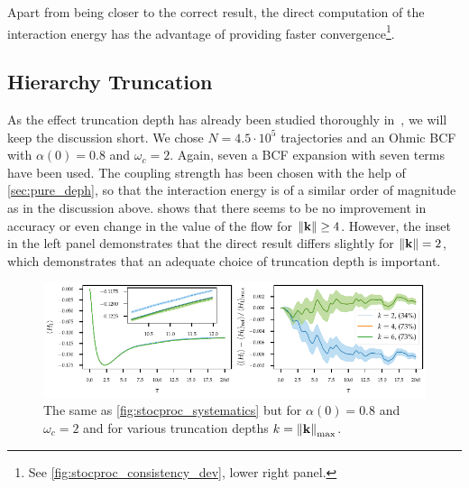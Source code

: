 Apart from being closer to the correct result, the direct computation
of the interaction energy has the advantage of providing faster
convergence\footnote{See \cref{fig:stocproc_consistency_dev}, lower right
  panel.}.

\subsection{Hierarchy Truncation}
\label{sec:trunc}
As the effect truncation depth has already been studied thoroughly
in~\cite{RichardDiss}, we will keep the discussion short.  We chose
\(N=4.5 \cdot 10^5\) trajectories and an Ohmic BCF with \(α(0)=0.8\)
and \(ω_c=2\). Again, seven a BCF expansion with seven terms have been
used. The coupling strength has been chosen with the help of
\cref{sec:pure_deph}, so that the interaction energy is of a similar
order of magnitude as in the discussion
above.  shows that there seems to be no
improvement in accuracy or even change in the value of the flow for
\(\norm{\vb{k}}\geq 4\). However, the inset in the left panel
demonstrates that the direct result differs slightly for
\(\norm{\vb{k}} = 2\), which demonstrates that an adequate choice of
truncation depth is important.
\begin{figure}[h]
  \centering
  \includegraphics{figs/one_bath_syst/k_systematics_interaction}
  \caption{\label{fig:k_systematics} The same as
    \cref{fig:stocproc_systematics} but for \(α(0)=0.8\) and
    \(ω_c=2\) and for various truncation depths \(k=\norm{\vb{k}}_{\mathrm{max}}\).}
\end{figure}

